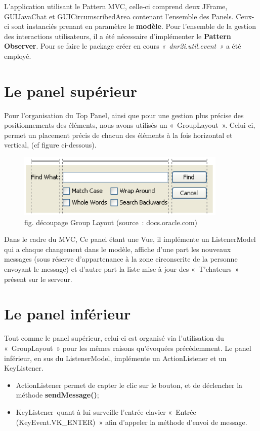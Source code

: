 \documentclass[a4paper,12pt]{report}
\begin{document}
    L’application utilisant le Pattern MVC, celle-ci comprend deux JFrame, GUIJavaChat et GUICircumscribedArea contenant l’ensemble des Panels. Ceux-ci sont instanciés prenant en paramètre le \textbf{modèle}.
    \medbreak
    Pour l’ensemble de la gestion des interactions utilisateurs, il a été nécessaire d’implémenter le \textbf{Pattern Observer}. Pour se faire le package créer en cours \emph{« dnr2i.util.event »} a été employé.

    \section{Le panel supérieur}
    Pour l’organisation du Top Panel, ainsi que pour une gestion plus précise des positionnements des éléments, nous avons utilisés un « GroupLayout ». Celui-ci, permet un placement précis de chacun des éléments à la fois horizontal et vertical, (cf figure ci-dessous).
    \medbreak
    \begin{figure}[!ht]%
      \centering 
      \includegraphics[width=10cm]{deecoupageGroupLayout.jpg}
      \caption{fig. découpage Group Layout (source : docs.oracle.com) }
    \end{figure}
    \bigbreak
    Dans le cadre du MVC, Ce panel étant une Vue, il implémente un ListenerModel qui a chaque changement dans le modèle, affiche d’une part les nouveaux messages (sous réserve d'appartenance à la zone circonscrite de la personne envoyant le message) et d’autre part la liste mise à jour des « T’chateurs » présent sur le serveur.

    \section{Le panel inférieur}
    Tout comme le panel supérieur, celui-ci est organisé via l’utilisation du « GroupLayout » pour les mêmes raisons qu’évoquées précédemment.
    \medbreak
    Le panel inférieur, en sus du ListenerModel, implémente un ActionListener et un KeyListener.
    \medbreak
    \begin{itemize}
      \item ActionListener permet de capter le clic sur le bouton, et de déclencher la méthode \textbf{sendMessage()};
      \item KeyListener quant à lui surveille l’entrée clavier « Entrée (KeyEvent.VK\_ENTER) » afin d’appeler la méthode d’envoi de message.
    \end{itemize}
    \bigbreak
\end{document}
